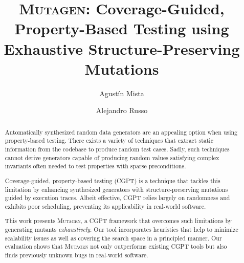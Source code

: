 \documentclass[sigconf,review,anonymous]{acmart}
\newcommand{\mutagen}{\textsc{Mutagen}\xspace}
\begin{document}
\title[\mutagen]{\mutagen: Coverage-Guided, Property-Based Testing using
  Exhaustive Structure-Preserving Mutations}



\author{Agust\'in Mista}

\author{Alejandro Russo}





\begin{abstract}
Automatically synthesized random data generators are an appealing option when
using property-based testing.
%
There exists a variety of techniques that extract static information from the
codebase to produce random test cases.
%
Sadly, such techniques cannot derive generators capable of producing random
values satisfying complex invariants often needed to test properties with sparse
preconditions.


Coverage-guided, property-based testing (CGPT) is a technique that tackles this
limitation by enhancing synthesized generators with structure-preserving
mutations guided by execution traces.
%
Albeit effective, CGPT relies largely on randomness and exhibits poor
scheduling, preventing its applicability in real-world software.


This work presents \mutagen, a CGPT framework that overcomes such limitations by
generating mutants \emph{exhaustively}.
%
Our tool incorporates heuristics that help to minimize scalability issues as well
as covering the search space in a principled manner.   
%
%
Our evaluation shows that \mutagen not only outperforms existing CGPT tools but
also finds previously unknown bugs in real-world software.
\end{abstract}
\end{document}
